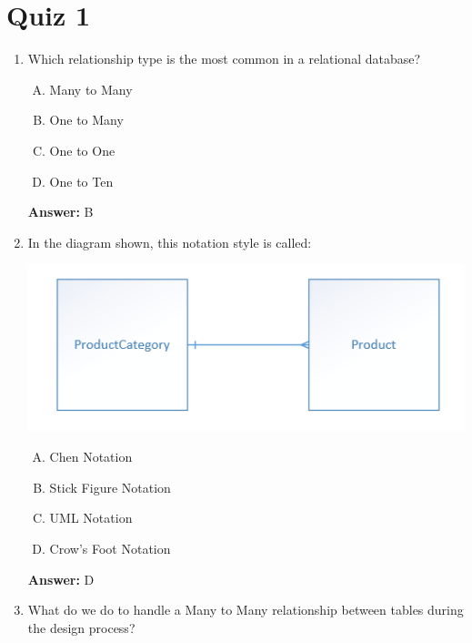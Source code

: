 \documentclass[12pt]{article}
\begin{document}
\bigskip

\section{Quiz 1}

\bigskip


\begin{enumerate}[1.]
    \item

    Which relationship type is the most common in a relational database?

    \bigskip

    \begin{enumerate}[A.]
        \item Many to Many
        \item One to Many
        \item One to One
        \item One to Ten
    \end{enumerate}

    \bigskip

    \textbf{Answer:} B

    \item

    In the diagram shown, this notation style is called:

    \bigskip

    \begin{center}
    \includegraphics[width=0.4\linewidth]{images/part_3_notes_8.png}
    \end{center}

    \begin{enumerate}[A.]
        \item Chen Notation
        \item Stick Figure Notation
        \item UML Notation
        \item Crow's Foot Notation
    \end{enumerate}

    \bigskip

    \textbf{Answer:} D

    \item

    What do we do to handle a Many to Many relationship between tables during
    the design process?


\end{enumerate}
\end{document}
